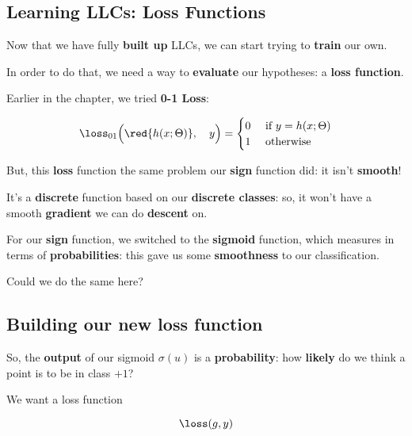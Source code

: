     \subsection*{Learning LLCs: Loss Functions}
    
        Now that we have fully \textbf{built up} LLCs, we can start trying to \textbf{train} our own. 
        
        In order to do that, we need a way to \textbf{evaluate} our hypotheses: a \textbf{loss function}.
        
        Earlier in the chapter, we tried \textbf{0-1 Loss}:

        \begin{equation*}
            \loss_{01}
            \Big(  
                \red{h(x; \Theta)} ,\quad  y 
            \Big) 
            =
            \begin{cases}
                0 & \text{ if } y = h(x; \Theta)\\
                1 & \text{ otherwise}
            \end{cases}   
        \end{equation*}
        
        But, this \textbf{loss} function the same problem our \textbf{sign} function did: it isn't \textbf{smooth}! 
        
        It's a \textbf{discrete} function based on our \textbf{discrete classes}: so, it won't have a smooth \textbf{gradient} we can do \textbf{descent} on.
        
        For our \textbf{sign} function, we switched to the \textbf{sigmoid} function, which measures in terms of \textbf{probabilities}: this gave us some \textbf{smoothness} to our classification.
        
        Could we do the same here?
        
    \subsection*{Building our new loss function}
    
        So, the \textbf{output} of our sigmoid $\sigma(u)$ is a \textbf{probability}: how \textbf{likely} do we think a point is to be in class $+1$?
        
        We want a loss function
        
        \begin{equation}
            \loss(g,y)
        \end{equation}
        
